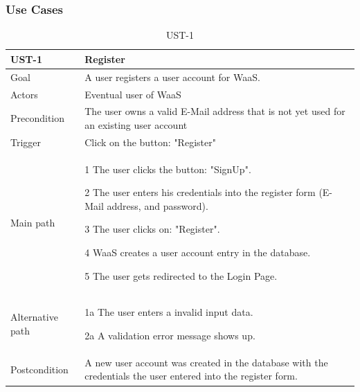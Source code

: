 \documentclass[titlepage, 12pt]{article}
\newenvironment{packed_itemize}{
  \vspace{-\topsep}
  \begin{itemize}
    \setlength{\itemsep}{1pt}
    \setlength{\parskip}{0pt}
    \setlength{\parsep}{0pt}
  }{\end{itemize}}
\begin{document}
\subsubsection{{Use Cases}}

\begin{table}[H]
  \begin{center}

    \begin{tabular}{p{4cm}|p{10cm}}
      \textbf{UST-1}   & \textbf{Register}                                                                                            \\
      \hline
      Goal             & A user registers a user account for WaaS.                                                                    \\
      \hline
      Actors           & Eventual user of WaaS                                                                                        \\
      \hline
      Precondition     & The user owns a valid E-Mail address that is not yet used for an existing user account                        \\
      \hline
      Trigger          & Click on the button: "Register"                                                                              \\
      \hline
      Main path        &
      \begin{packed_itemize}
        \item [1] The user clicks the button: "SignUp".
        \item [2] The user enters his credentials into the register form (E-Mail address, and password).
        \item [3] The user clicks on: "Register".
        \item [4] WaaS creates a user account entry in the database.
        \item [5] The user gets redirected to the Login Page.
      \end{packed_itemize}                                                                                                       \\
      \hline
      Alternative path &
      \begin{packed_itemize}
        \item [1a] The user enters a invalid input data.
        \item [2a] A validation error message shows up.
      \end{packed_itemize}                                                                                                       \\
      \hline
      Postcondition    & A new user account was created in the database with the credentials the user entered into the register form. \\
    \end{tabular}

    \caption{UST-1}
    \label{table:UST-1}

  \end{center}
\end{table}
\end{document}
